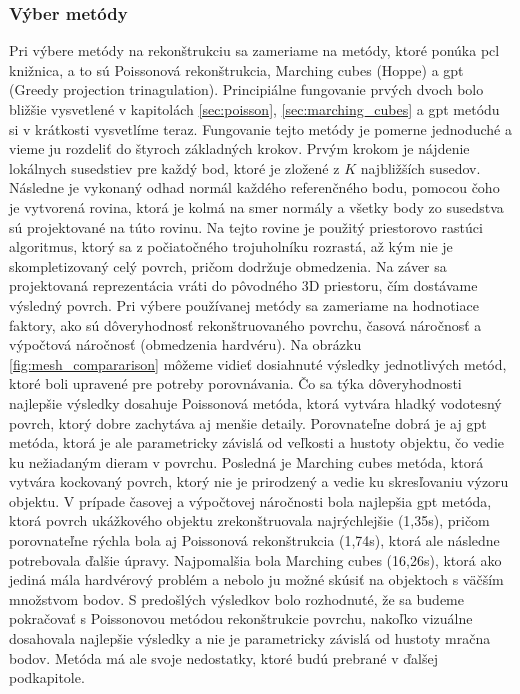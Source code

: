\subsubsection{Výber metódy}
\noindent Pri výbere metódy na rekonštrukciu sa zameriame na metódy, ktoré ponúka \acrshort{pcl} knižnica, a to sú Poissonová rekonštrukcia, Marching cubes (Hoppe) a \acrshort{gpt} (Greedy projection trinagulation). Principiálne fungovanie prvých dvoch bolo bližšie vysvetlené v kapitolách \ref{sec:poisson}, \ref{sec:marching_cubes} a \acrshort{gpt} metódu si v krátkosti vysvetlíme teraz. 
\newline\indent Fungovanie tejto metódy je pomerne jednoduché a vieme ju rozdeliť do štyroch základných krokov. Prvým krokom je nájdenie lokálnych susedstiev pre každý bod, ktoré je zložené z $K$ najbližších susedov. Následne je vykonaný odhad normál každého referenčného bodu, pomocou čoho je vytvorená rovina, ktorá je kolmá na smer normály a všetky body zo susedstva sú projektované na túto rovinu. Na tejto rovine je použitý priestorovo rastúci algoritmus, ktorý sa z počiatočného trojuholníku rozrastá, až kým nie je skompletizovaný celý povrch, pričom dodržuje obmedzenia. Na záver sa projektovaná reprezentácia vráti do pôvodného 3D priestoru, čím dostávame výsledný povrch. \cite{GreedyTriangulation}
\newline\indent Pri výbere používanej metódy sa zameriame na hodnotiace faktory, ako sú dôveryhodnosť rekonštruovaného povrchu, časová náročnosť a výpočtová náročnosť (obmedzenia hardvéru). Na obrázku \ref{fig:mesh_compararison} môžeme vidieť dosiahnuté výsledky jednotlivých metód, ktoré boli upravené pre potreby porovnávania. Čo sa týka dôveryhodnosti najlepšie výsledky dosahuje Poissonová metóda, ktorá vytvára hladký vodotesný povrch, ktorý dobre zachytáva aj menšie detaily. Porovnateľne dobrá je aj \acrshort{gpt} metóda, ktorá je ale parametricky závislá od veľkosti a hustoty objektu, čo vedie ku nežiadaným dieram v povrchu. Posledná je Marching cubes metóda, ktorá vytvára kockovaný povrch, ktorý nie je prirodzený a vedie ku skresľovaniu výzoru objektu.
\newline\indent V prípade časovej a výpočtovej náročnosti bola najlepšia \acrshort{gpt} metóda, ktorá povrch ukážkového objektu zrekonštruovala najrýchlejšie (1,35s), pričom porovnateľne rýchla bola aj Poissonová rekonštrukcia (1,74s), ktorá ale následne potrebovala ďalšie úpravy. Najpomalšia bola Marching cubes (16,26s), ktorá ako jediná mála hardvérový problém a nebolo ju možné skúsiť na objektoch s väčším množstvom bodov. 
\newline\indent S predošlých výsledkov bolo rozhodnuté, že sa budeme pokračovať s Poissonovou metódou rekonštrukcie povrchu, nakoľko vizuálne dosahovala najlepšie výsledky a nie je parametricky závislá od hustoty mračna bodov. Metóda má ale svoje nedostatky, ktoré budú prebrané v ďalšej podkapitole. 

